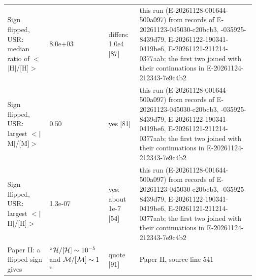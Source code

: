\begin{table}
\begin{tabular}{p{}p{}p{}p{}}
Sign flipped, USR: median ratio of $<$$|$H$|$/\allowbreak{}[H]$>$ & 8.0e+03 & differs: 1.0e4 [87] & this run (E-20261128-001644-500a097) from records of E-20261123-045030-c20bcb3, -035925-8439d79, E-20261122-190341-0419be6, E-20261121-211214-0377aab; the first two joined with their continuations in E-20261124-212343-7e9c4b2 \\
Sign flipped, USR: largest $<$$|$M$|$/\allowbreak{}[M]$>$ & 0.50 & yes [81] & this run (E-20261128-001644-500a097) from records of E-20261123-045030-c20bcb3, -035925-8439d79, E-20261122-190341-0419be6, E-20261121-211214-0377aab; the first two joined with their continuations in E-20261124-212343-7e9c4b2 \\
Sign flipped, USR: largest $<$$|$H$|$/\allowbreak{}[H]$>$ & 1.3e-07 & yes: about 1e-7 [54] & this run (E-20261128-001644-500a097) from records of E-20261123-045030-c20bcb3, -035925-8439d79, E-20261122-190341-0419be6, E-20261121-211214-0377aab; the first two joined with their continuations in E-20261124-212343-7e9c4b2 \\
Paper II: a flipped sign gives & ``${\cal H}/[{\cal H}]\sim 10^{-5}$ and  ${\cal M}/[{\cal M}]\sim 1$'' & quote [91] & Paper II, source line 541 \\
\bottomrule
\end{tabular}
\end{table}

